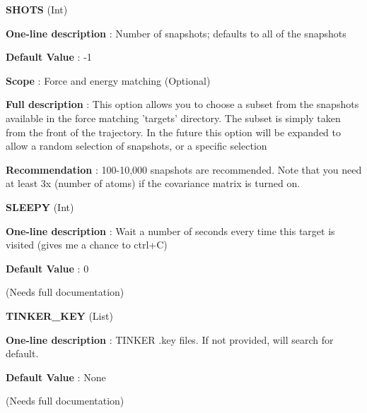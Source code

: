 \begin{DoxyItemize}
\item {\bfseries  S\-H\-O\-T\-S } (Int) \par
{\bfseries  One-\/line description }\-: Number of snapshots; defaults to all of the snapshots \par
{\bfseries  Default Value }\-: -\/1 \par
{\bfseries  Scope }\-: Force and energy matching (Optional) \par
{\bfseries  Full description }\-: This option allows you to choose a subset from the snapshots available in the force matching 'targets' directory. The subset is simply taken from the front of the trajectory. In the future this option will be expanded to allow a random selection of snapshots, or a specific selection \par
{\bfseries  Recommendation }\-: 100-\/10,000 snapshots are recommended. Note that you need at least 3x (number of atoms) if the covariance matrix is turned on.\end{DoxyItemize}
\begin{DoxyItemize}
\item {\bfseries  S\-L\-E\-E\-P\-Y } (Int) \par
{\bfseries  One-\/line description }\-: Wait a number of seconds every time this target is visited (gives me a chance to ctrl+\-C) \par
{\bfseries  Default Value }\-: 0 \par
(Needs full documentation)\end{DoxyItemize}
\begin{DoxyItemize}
\item {\bfseries  T\-I\-N\-K\-E\-R\-\_\-\-K\-E\-Y } (List) \par
{\bfseries  One-\/line description }\-: T\-I\-N\-K\-E\-R .key files. If not provided, will search for default. \par
{\bfseries  Default Value }\-: None \par
(Needs full documentation)\end{DoxyItemize}
